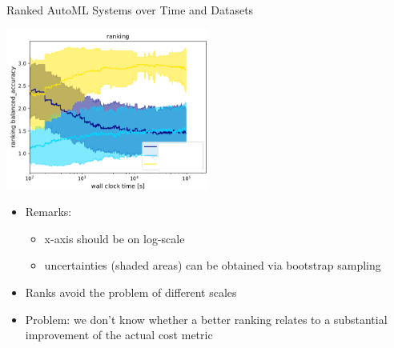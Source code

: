 \begin{frame}[c]{Ranked AutoML Systems over Time and Datasets}


\centering
\includegraphics[width=0.5\textwidth]{images/rankings_over_time.png}

\begin{itemize}
	\item Remarks:
	\begin{itemize}
		\item x-axis should be on log-scale
		\item uncertainties (shaded areas) can be obtained via bootstrap sampling
	\end{itemize}
    \pause
    \smallskip
	\item Ranks avoid the problem of different scales
	\item Problem: we don't know whether a better ranking relates to a substantial improvement of the actual cost metric
\end{itemize}

\end{frame}
